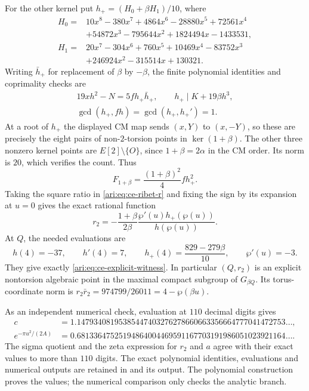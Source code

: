 For the other kernel put $h_+=(H_0+\beta H_1)/10$, where
\[
 \begin{aligned}
 H_0={}&10x^8-380x^7+4864x^6-28880x^5+72561x^4\\
       &+54872x^3-795644x^2+1824494x-1433531,\\
 H_1={}&20x^7-304x^6+760x^5+10469x^4-83752x^3\\
       &+246924x^2-315514x+130321.
 \end{aligned}
\]
Writing $\bar h_+$ for replacement of $\beta$ by $-\beta$,
the finite polynomial identities and coprimality checks are
\[
 \begin{gathered}
 19xh^2-N=5f h_+\bar h_+,\qquad
 h_+\mid K+19\beta h^3,\\
 \gcd(h_+,fh)=\gcd(h_+,h_+')=1.
 \end{gathered}
\]
At a root of $h_+$ the displayed CM map sends $(x,Y)$ to
$(x,-Y)$, so these are precisely the eight pairs of
non-$2$-torsion points in $\ker(1+\beta)$. The other three
nonzero kernel points are $E[2]\setminus\{O\}$, since
$1+\beta=2\alpha$ in the CM order. Its norm is $20$,
which verifies the count. Thus
\[
 F_{1+\beta}=\frac{(1+\beta)^2}{4}f h_+^2.
\]
Taking the square ratio in \eqref{ari:eq:ce-ribet-r} and fixing
the sign by its expansion at $u=0$ gives the exact rational
function
\[
 r_2=-\frac{1+\beta}{2\beta}\frac{\wp'(u)h_+(\wp(u))}
                                             {h(\wp(u))}.
\]
At $Q$, the needed evaluations are
\[
 h(4)=-37,\qquad h'(4)=7,\qquad
 h_+(4)=\frac{829-279\beta}{10},\qquad\wp'(u)=-3.
\]
They give exactly \eqref{ari:eq:ce-explicit-witness}. In
particular $(Q,r_2)$ is an explicit nontorsion algebraic
point in the maximal compact subgroup of $G_{\beta Q}$.
Its torus-coordinate norm is
$r_2\bar r_2=974799/26011=4-\wp(\beta u)$.

As an independent numerical check, evaluation at $110$
decimal digits gives
\[
 \begin{aligned}
 c&=1.14793408195385447403276278660663356664777041472753\ldots,\\
 e^{-\pi u^2/(2A)}
  &=0.68133647525194864004469591167703191986051023921164\ldots.
 \end{aligned}
\]
The sigma quotient and the zeta expression for $r_2$ and $a$
agree with their exact values to more than $110$ digits.
The exact polynomial identities, evaluations and numerical
outputs are retained in  and
its output. The polynomial construction proves the values;
the numerical comparison only checks the analytic branch.
